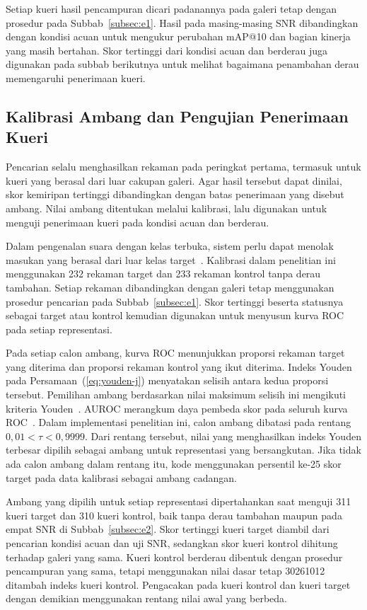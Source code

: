 Setiap kueri hasil pencampuran dicari padanannya pada galeri tetap dengan prosedur pada Subbab~\ref{subsec:e1}. Hasil pada masing-masing SNR dibandingkan dengan kondisi acuan untuk mengukur perubahan mAP@10 dan bagian kinerja yang masih bertahan. Skor tertinggi dari kondisi acuan dan berderau juga digunakan pada subbab berikutnya untuk melihat bagaimana penambahan derau memengaruhi penerimaan kueri.

\subsection{Kalibrasi Ambang dan Pengujian Penerimaan Kueri}
\label{subsec:e3}

Pencarian selalu menghasilkan rekaman pada peringkat pertama, termasuk untuk kueri yang berasal dari luar cakupan galeri. Agar hasil tersebut dapat dinilai, skor kemiripan tertinggi dibandingkan dengan batas penerimaan yang disebut ambang. Nilai ambang ditentukan melalui kalibrasi, lalu digunakan untuk menguji penerimaan kueri pada kondisi acuan dan berderau.

Dalam pengenalan suara dengan kelas terbuka, sistem perlu dapat menolak masukan yang berasal dari luar kelas target~\cite{you2024openset}. Kalibrasi dalam penelitian ini menggunakan 232 rekaman target dan 233 rekaman kontrol tanpa derau tambahan. Setiap rekaman dibandingkan dengan galeri tetap menggunakan prosedur pencarian pada Subbab~\ref{subsec:e1}. Skor tertinggi beserta statusnya sebagai target atau kontrol kemudian digunakan untuk menyusun kurva ROC pada setiap representasi.

Pada setiap calon ambang, kurva ROC menunjukkan proporsi rekaman target yang diterima dan proporsi rekaman kontrol yang ikut diterima. Indeks Youden pada Persamaan~(\ref{eq:youden-j}) menyatakan selisih antara kedua proporsi tersebut. Pemilihan ambang berdasarkan nilai maksimum selisih ini mengikuti kriteria Youden~\cite{hassanzad2024youden,schisterman2005cut}. AUROC merangkum daya pembeda skor pada seluruh kurva ROC~\cite{saito2015pr}. Dalam implementasi penelitian ini, calon ambang dibatasi pada rentang $0{,}01<\tau<0{,}9999$. Dari rentang tersebut, nilai yang menghasilkan indeks Youden terbesar dipilih sebagai ambang untuk representasi yang bersangkutan. Jika tidak ada calon ambang dalam rentang itu, kode menggunakan persentil ke-25 skor target pada data kalibrasi sebagai ambang cadangan.

Ambang yang dipilih untuk setiap representasi dipertahankan saat menguji 311 kueri target dan 310 kueri kontrol, baik tanpa derau tambahan maupun pada empat SNR di Subbab~\ref{subsec:e2}. Skor tertinggi kueri target diambil dari pencarian kondisi acuan dan uji SNR, sedangkan skor kueri kontrol dihitung terhadap galeri yang sama. Kueri kontrol berderau dibentuk dengan prosedur pencampuran yang sama, tetapi menggunakan nilai dasar tetap 30261012 ditambah indeks kueri kontrol. Pengacakan pada kueri kontrol dan kueri target dengan demikian menggunakan rentang nilai awal yang berbeda.

